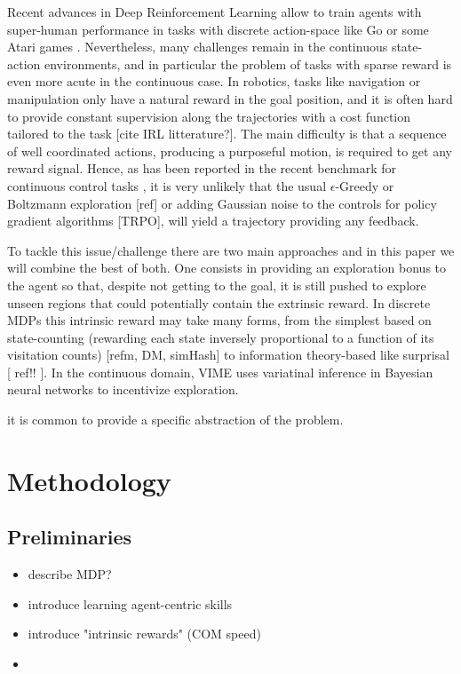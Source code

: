 \documentclass{article}[10pt]%
\begin{document}
Recent advances in Deep Reinforcement Learning allow to train agents with super-human performance in tasks with discrete action-space like Go \cite{2016go} or some Atari games \cite{mnih2015human}. Nevertheless, many challenges remain in the continuous state-action environments, and in particular the problem of tasks with sparse reward is even more acute in the continuous case. In robotics, tasks like navigation or manipulation only have a natural reward in the goal position, and it is often hard to provide constant supervision along the trajectories with a cost function tailored to the task [cite IRL litterature?]. The main difficulty is that a sequence of well coordinated actions, producing a purposeful motion, is required to get any reward signal. Hence, as has been reported in the recent benchmark for continuous control tasks \cite{yuan2015}, it is very unlikely that the usual $\epsilon$-Greedy or Boltzmann exploration [ref] or adding Gaussian noise to the controls for policy gradient algorithms [TRPO], will yield a trajectory providing any feedback. 

To tackle this issue/challenge there are two main approaches and in this paper we will combine the best of both. One consists in providing an exploration bonus to the agent so that, despite not getting to the goal, it is still pushed to explore unseen regions that could potentially contain the extrinsic reward. In discrete MDPs this intrinsic reward may take many forms, from the simplest based on state-counting (rewarding each state inversely proportional to a function of its visitation counts) [refm, DM, simHash] to information theory-based like surprisal [ ref!! ]. In the continuous domain, VIME uses variatinal inference in Bayesian neural networks to incentivize exploration.

it is common to provide a specific abstraction of the problem.

\section{Methodology}

\subsection{Preliminaries}
\begin{itemize}
    \item describe MDP?
    \item introduce learning agent-centric skills
    \item introduce "intrinsic rewards" (COM speed)
    \item 
\end{itemize}
\end{document}
